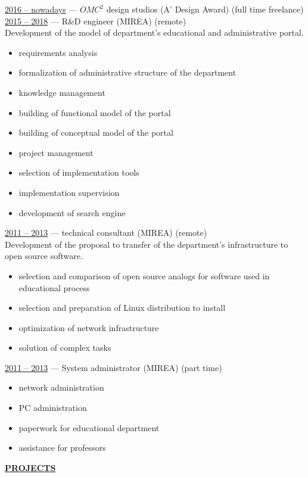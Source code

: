 \documentclass[a4paper,10pt,fullpage]{article}
\begin{document}
\underline{2016 -- nowadays} --- $ OMC^{2} $ design studios (A' Design Award) (full time freelance) \\

\underline{2015 -- 2018} --- R\&D engineer (MIREA) (remote)\\
Development of the model of department's educational and administrative portal.
\begin{itemize}
	\item requirements analysis
	\item formalization of administrative structure of the department
	\item knowledge management
	\item building of functional model of the portal
	\item building of conceptual model of the portal
	\item project management
	\item selection of implementation tools
	\item implementation supervision
	\item development of search engine
\end{itemize}

\underline{2011 -- 2013} ---  technical consultant (MIREA) (remote)\\
Development of the proposal to transfer of the department's infrastructure to 
open source software.
\begin{itemize}
	\item selection and comparison of open source analogs for software used 
in educational process
	\item selection and preparation of Linux distribution to install
	\item optimization of network infrastructure
	\item solution of complex tasks\\
\end{itemize}

\underline{2011 -- 2013} --- System administrator (MIREA) (part time)
\begin{itemize}
	\item network administration
	\item PC administration
	\item paperwork for educational department
	\item assistance for professors
\end{itemize}

\begin{center}
	\underline{\textbf{PROJECTS}}
\end{center}
\end{document}
